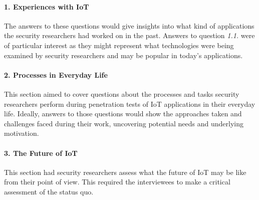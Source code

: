 \paragraph{1. Experiences with IoT} The answers to these questions would give insights into what kind of applications the security researchers had worked on in the past. Answers to question \emph{1.1.} were of particular interest as they might represent what technologies were being examined by security researchers and may be popular in today’s applications.
\paragraph{2. Processes in Everyday Life} This section aimed to cover questions about the processes and tasks security researchers perform during penetration tests of IoT applications in their everyday life. Ideally, answers to those questions would show the approaches taken and challenges faced during their work, uncovering potential needs and underlying motivation.
\paragraph{3. The Future of IoT} This section had security researchers assess what the future of IoT may be like from their point of view. This required the interviewees to make a critical assessment of the status quo.



